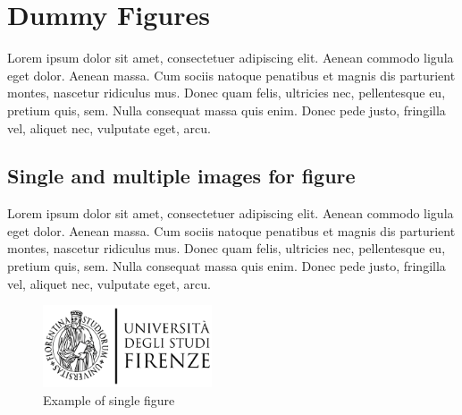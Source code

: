 % 
\chapter{Dummy Figures} %

Lorem ipsum dolor sit amet, consectetuer adipiscing elit. Aenean commodo ligula eget dolor. Aenean massa. Cum sociis natoque penatibus et magnis dis parturient montes, nascetur ridiculus mus. Donec quam felis, ultricies nec, pellentesque eu, pretium quis, sem. Nulla consequat massa quis enim. Donec pede justo, fringilla vel, aliquet nec, vulputate eget, arcu.


\section{Single and multiple images for figure}

Lorem ipsum dolor sit amet, consectetuer adipiscing elit. Aenean commodo ligula eget dolor. Aenean massa. Cum sociis natoque penatibus et magnis dis parturient montes, nascetur ridiculus mus. Donec quam felis, ultricies nec, pellentesque eu, pretium quis, sem. Nulla consequat massa quis enim. Donec pede justo, fringilla vel, aliquet nec, vulputate eget, arcu.

\begin{figure}[H]
    \centering
    \includegraphics[width=5cm]{img/logo_unifi.png} %
    \caption{Example of single figure}
\end{figure}

